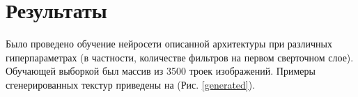 \documentclass[a4paper]{article}
\begin{document}
	\section{Результаты}
		Было проведено обучение нейросети описанной архитектуры при различных гиперпараметрах (в частности, количестве фильтров на первом сверточном слое). Обучающей выборкой был массив из 3500 троек изображений. Примеры сгенерированных текстур приведены на (Рис. \ref{generated}).
		\begin{figure}
			\begin{minipage}{0.3\linewidth}
			\end{minipage}
			\hfill
			\begin{minipage}{0.3\linewidth}

\end{minipage}
\end{figure}
\end{document}

